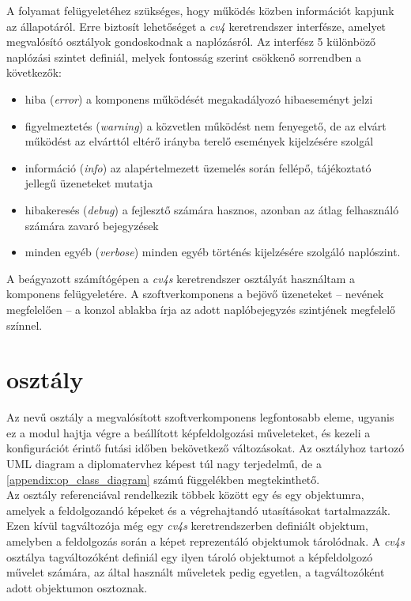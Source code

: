 A folyamat felügyeletéhez szükséges, hogy működés közben információt kapjunk az állapotáról. Erre biztosít lehetőséget a \emph{cv4} keretrendszer  interfésze, amelyet megvalósító osztályok gondoskodnak a naplózásról. Az interfész 5 különböző naplózási szintet definiál, melyek fontosság szerint csökkenő sorrendben a következők:
\begin{itemize}
\item hiba (\emph{error}) a komponens működését megakadályozó hibaeseményt jelzi
\item figyelmeztetés (\emph{warning}) a közvetlen működést nem fenyegető, de az elvárt működést az elvárttól eltérő irányba terelő események kijelzésére szolgál
\item információ (\emph{info}) az alapértelmezett üzemelés során fellépő, tájékoztató jellegű üzeneteket mutatja
\item hibakeresés (\emph{debug}) a fejlesztő számára hasznos, azonban az átlag felhasználó számára zavaró bejegyzések
\item minden egyéb (\emph{verbose}) minden egyéb történés kijelzésére szolgáló naplószint.
\end{itemize}

A beágyazott számítógépen a \emph{cv4s} keretrendszer  osztályát használtam a komponens felügyeletére. A szoftverkomponens a bejövő üzeneteket -- nevének megfelelően -- a konzol ablakba írja az adott naplóbejegyzés szintjének megfelelő színnel.

\section{ osztály}

Az  nevű osztály a megvalósított szoftverkomponens legfontosabb eleme, ugyanis ez a modul hajtja végre a beállított képfeldolgozási műveleteket, és kezeli a konfigurációt érintő futási időben bekövetkező változásokat. Az osztályhoz tartozó UML diagram a diplomatervhez képest túl nagy terjedelmű, de a \ref{appendix:op_class_diagram} számú függelékben megtekinthető.\\
Az osztály referenciával rendelkezik többek között egy  és egy  objektumra, amelyek a feldolgozandó képeket és a végrehajtandó utasításokat tartalmazzák. Ezen kívül tagváltozója még egy \emph{cv4s} keretrendszerben definiált  objektum, amelyben a feldolgozás során a képet reprezentáló  objektumok tárolódnak. A \emph{cv4s}  osztálya tagváltozóként definiál egy ilyen tároló objektumot a képfeldolgozó művelet számára, az  által használt műveletek pedig egyetlen, a tagváltozóként adott  objektumon osztoznak. 

